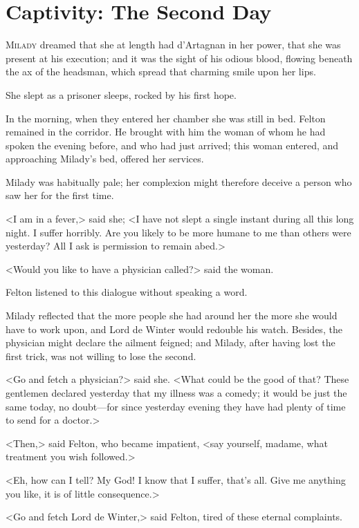 
\chapter{Captivity: The Second Day}

\lettrine[]{M}{ilady} dreamed that she at length had d'Artagnan in her power, that she was present at his execution; and it was the sight of his odious blood, flowing beneath the ax of the headsman, which spread that charming smile upon her lips. 

She slept as a prisoner sleeps, rocked by his first hope. 

In the morning, when they entered her chamber she was still in bed. Felton remained in the corridor. He brought with him the woman of whom he had spoken the evening before, and who had just arrived; this woman entered, and approaching Milady's bed, offered her services. 

Milady was habitually pale; her complexion might therefore deceive a person who saw her for the first time. 

<I am in a fever,> said she; <I have not slept a single instant during all this long night. I suffer horribly. Are you likely to be more humane to me than others were yesterday? All I ask is permission to remain abed.> 

<Would you like to have a physician called?> said the woman. 

Felton listened to this dialogue without speaking a word. 

Milady reflected that the more people she had around her the more she would have to work upon, and Lord de Winter would redouble his watch. Besides, the physician might declare the ailment feigned; and Milady, after having lost the first trick, was not willing to lose the second. 

<Go and fetch a physician?> said she. <What could be the good of that? These gentlemen declared yesterday that my illness was a comedy; it would be just the same today, no doubt---for since yesterday evening they have had plenty of time to send for a doctor.> 

<Then,> said Felton, who became impatient, <say yourself, madame, what treatment you wish followed.> 

<Eh, how can I tell? My God! I know that I suffer, that's all. Give me anything you like, it is of little consequence.> 

<Go and fetch Lord de Winter,> said Felton, tired of these eternal complaints. 

